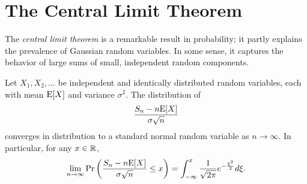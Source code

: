 \section{The Central Limit Theorem}

The \emph{central limit theorem} is a remarkable result in probability; it partly explains the prevalence of Gaussian random variables.
In some sense, it captures the behavior of large sums of small, independent random components.

\begin{theorem} 
Let $X_1, X_2, \ldots$ be independent and identically distributed random variables, each with mean $\mathrm{E} [X]$ and variance $\sigma^2$.
The distribution of
\begin{equation*}
\frac{ S_n - n \mathrm{E} [X] }{ \sigma \sqrt{n} }
\end{equation*}
converges in distribution to a standard normal random variable as $n \rightarrow \infty$.
In particular, for any $x \in \mathbb{R}$,
\begin{equation*}
\lim_{n \rightarrow \infty}
\Pr \left( \frac{ S_n - n \mathrm{E} [X] }{ \sigma \sqrt{n} } \leq x \right)
= \int_{- \infty}^x \frac{1}{\sqrt{2 \pi}} e^{- \frac{\xi^2}{2}} d\xi .
\end{equation*}
\end{theorem}

